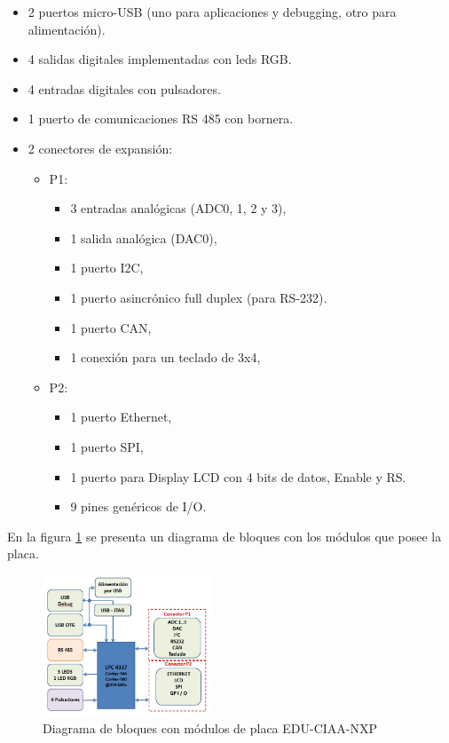 \documentclass{IEEEtran}
\begin{document}
\begin{itemize}
    \item 2 puertos micro-USB (uno para aplicaciones y debugging, otro para alimentación).
    \item 4 salidas digitales implementadas con leds RGB.
    \item 4 entradas digitales con pulsadores.
    \item 1 puerto de comunicaciones RS 485 con bornera.
    \item 2 conectores de expansión:
    \begin{itemize}
        \item P1:
        \begin{itemize}
            \item 3 entradas analógicas (ADC0, 1, 2 y 3),
            \item 1 salida analógica (DAC0),
            \item 1 puerto I2C,
            \item 1 puerto asincrónico full duplex (para RS-232).
            \item 1 puerto CAN,
            \item 1 conexión para un teclado de 3x4,
        \end{itemize}
        \item P2:
        \begin{itemize}
            \item 1 puerto Ethernet,
            \item 1 puerto SPI,
            \item 1 puerto para Display LCD con 4 bits de datos, Enable y RS.
            \item 9 pines genéricos de I/O.
        \end{itemize}
    \end{itemize}
\end{itemize}

En la figura \ref{fig:edu-ciaa-modulos} se presenta un diagrama de bloques con los módulos que posee la placa.

\begin{figure}
    \centering
    \includegraphics[width=0.45\textwidth]{../modulos_edu_ciaa.jpg}
    \caption{Diagrama de bloques con módulos de placa EDU-CIAA-NXP}
    \label{fig:edu-ciaa-modulos}
\end{figure}
\end{document}
